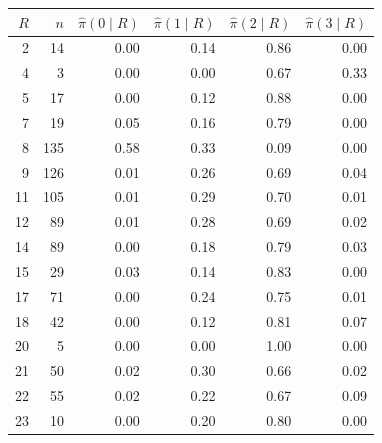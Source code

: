 \begin{tabular}{rrrrrr}
\toprule
$R$ & $n$ & $\hat\pi(0\mid R)$ & $\hat\pi(1\mid R)$ & $\hat\pi(2\mid R)$ & $\hat\pi(3\mid R)$ \\
\midrule
2 & 14 & 0.00 & 0.14 & 0.86 & 0.00 \\
4 & 3 & 0.00 & 0.00 & 0.67 & 0.33 \\
5 & 17 & 0.00 & 0.12 & 0.88 & 0.00 \\
7 & 19 & 0.05 & 0.16 & 0.79 & 0.00 \\
8 & 135 & 0.58 & 0.33 & 0.09 & 0.00 \\
9 & 126 & 0.01 & 0.26 & 0.69 & 0.04 \\
11 & 105 & 0.01 & 0.29 & 0.70 & 0.01 \\
12 & 89 & 0.01 & 0.28 & 0.69 & 0.02 \\
14 & 89 & 0.00 & 0.18 & 0.79 & 0.03 \\
15 & 29 & 0.03 & 0.14 & 0.83 & 0.00 \\
17 & 71 & 0.00 & 0.24 & 0.75 & 0.01 \\
18 & 42 & 0.00 & 0.12 & 0.81 & 0.07 \\
20 & 5 & 0.00 & 0.00 & 1.00 & 0.00 \\
21 & 50 & 0.02 & 0.30 & 0.66 & 0.02 \\
22 & 55 & 0.02 & 0.22 & 0.67 & 0.09 \\
23 & 10 & 0.00 & 0.20 & 0.80 & 0.00 \\
\bottomrule
\end{tabular}
